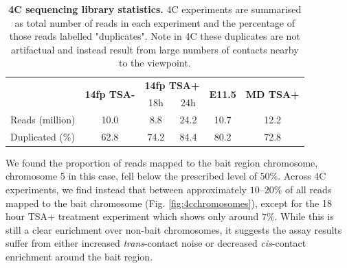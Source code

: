 \documentclass[a4paper,11pt,oneside]{book}
\begin{document}
\begin{table}[]
\centering
\caption[4C sequencing library statistics.]{ {\bf 4C sequencing library statistics.}
4C experiments are summarised as total number of reads in each experiment and the percentage of those reads labelled "duplicates". Note in 4C these duplicates are not artifactual and instead result from large numbers of contacts nearby to the viewpoint.
}
\label{tab:4c}
\begin{tabular}{l|c|cc|c|c|}
\cline{2-6}
                                      & \multirow{2}{*}{{\bf 14fp TSA-}} & \multicolumn{2}{c|}{{\bf 14fp TSA+}} & \multirow{2}{*}{{\bf E11.5}} & \multirow{2}{*}{{\bf MD TSA+}} \\
                                      &                                  & 18h               & 24h              &                              &                                \\ \hline
\multicolumn{1}{|l|}{Reads (million)} & 10.0                             & 8.8               & 24.2             & 10.7                         & 12.2                           \\
\multicolumn{1}{|l|}{Duplicated (\%)} & 62.8                             & 74.2              & 84.4             & 80.2                         & 72.8                           \\ \hline
\end{tabular}
\end{table}


We found the proportion of reads mapped to the bait region chromosome, chromosome 5 in this case, fell below the prescribed level of $50\%$. Across 4C experiments, we find instead that between approximately $10$--$20\%$ of all reads mapped to the bait chromosome (Fig. \ref{fig:4cchromosomes}), except for  the 18 hour TSA+ treatment experiment which shows only around $7\%$. While this is still a clear enrichment over non-bait chromosomes, it suggests the assay results suffer from either increased \emph{trans}-contact noise or decreased \emph{cis}-contact enrichment around the bait region. 
\end{document}
